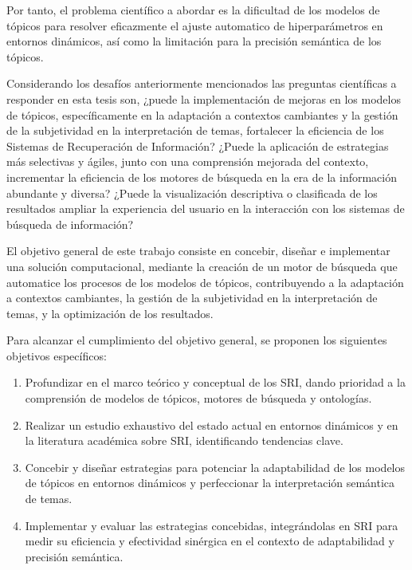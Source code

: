Por tanto, el problema cient\'ifico a abordar es la dificultad de los modelos de t\'opicos para resolver eficazmente el ajuste automatico de hiperpar\'ametros en entornos din\'amicos, as\'i como la limitaci\'on para la precisi\'on sem\'antica de los t\'opicos.

Considerando los desafíos anteriormente mencionados las preguntas cient\'ificas a responder en esta tesis son, ¿puede la implementación de mejoras en los modelos de tópicos, específicamente en la adaptación a contextos cambiantes y la gestión de la subjetividad en la interpretación de temas, fortalecer la eficiencia de los Sistemas de Recuperación de Información? ¿Puede la aplicación de estrategias más selectivas y ágiles, junto con una comprensión mejorada del contexto, incrementar la eficiencia de los motores de búsqueda en la era de la información abundante y diversa? ¿Puede la visualización descriptiva o clasificada de los resultados ampliar la experiencia del usuario en la interacción con los sistemas de búsqueda de información?

El objetivo general de este trabajo consiste en concebir, diseñar e implementar una solución computacional, mediante la creaci\'on de un motor de b\'usqueda que automatice los procesos de los modelos de tópicos, contribuyendo a la adaptación a contextos cambiantes, la gestión de la subjetividad en la interpretación de temas, y la optimizaci\'on de los resultados. 

Para alcanzar el cumplimiento del objetivo general, se proponen los siguientes objetivos específicos:

\begin{enumerate}
	\item Profundizar en el marco teórico y conceptual de los SRI, dando prioridad a la comprensión de modelos de tópicos, motores de búsqueda y ontologías.
	
	\item Realizar un estudio exhaustivo del estado actual en entornos dinámicos y en la literatura académica sobre SRI, identificando tendencias clave.
	
	\item Concebir y diseñar estrategias para potenciar la adaptabilidad de los modelos de tópicos en entornos dinámicos y perfeccionar la interpretación semántica de temas.
	
	\item Implementar y evaluar las estrategias concebidas, integrándolas en SRI para medir su eficiencia y efectividad sinérgica en el contexto de adaptabilidad y precisión semántica.
\end{enumerate}

